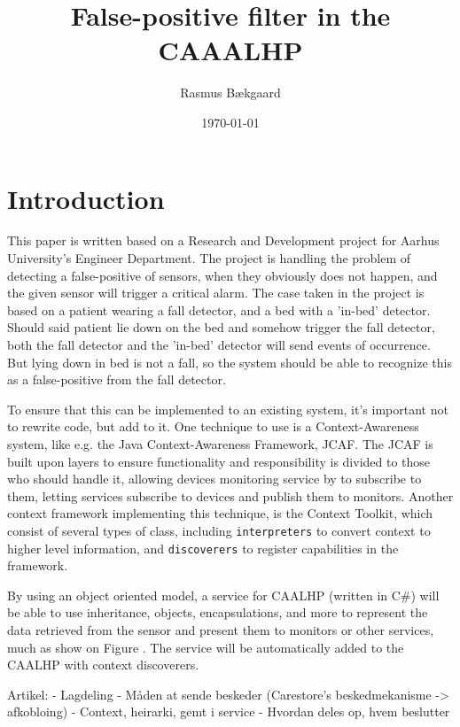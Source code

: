 \documentclass[jou]{apa6}
\title{False-positive filter in the CAAALHP}
\author{Rasmus Bækgaard}
\affiliation{Aarhus University}
\date{\today}
\begin{document}
\maketitle

\section{Introduction}
This paper is written based on a Research and Development project for Aarhus University's Engineer Department.
The project is handling the problem of detecting a false-positive of sensors, when they obviously does not happen, and the given sensor will trigger a critical alarm.
The case taken in the project is based on a patient wearing a fall detector, and a bed with a 'in-bed' detector.
Should said patient lie down on the bed and somehow trigger the fall detector, both the fall detector and the 'in-bed' detector will send events of occurrence. 
But lying down in bed is not a fall, so the system should be able to recognize this as a false-positive from the fall detector.

To ensure that this can be implemented to an existing system, it's important not to rewrite code, but add to it.
One technique to use is a Context-Awareness system, like e.g. the Java Context-Awareness Framework, JCAF.
The JCAF is built upon layers to ensure functionality and responsibility is divided to those who should handle it, allowing devices monitoring service by to subscribe to them, letting services subscribe to devices and publish them to monitors.
Another context framework implementing this technique, is the Context Toolkit, which consist of several types of class, including \texttt{interpreters} to convert context to higher level information, and \texttt{discoverers} to register capabilities in the framework.

By using an object oriented model, a service for CAALHP (written in C\#) will be able to use inheritance, objects, encapsulations, and more to represent the data retrieved from the sensor and present them to monitors or other services, much as show on Figure .
The service will be automatically added to the CAALHP with context discoverers.





Artikel:
- Lagdeling
- Måden at sende beskeder (Carestore's beskedmekanisme -> afkobloing)
- Context, heirarki, gemt i service
- Hvordan deles op, hvem beslutter
\end{document}
